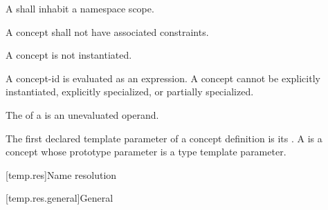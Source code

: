 \pnum
A 
shall inhabit a namespace scope.

\pnum
A concept shall not have associated constraints.

\pnum
A concept is not instantiated.
\begin{note}
A concept-id is evaluated as an expression.
A concept cannot be
explicitly instantiated,
explicitly specialized,
or partially specialized.
\end{note}

\pnum
The  of a 
is an unevaluated operand.

\pnum
The first declared template parameter of a concept definition is its
.
%
A 
is a concept whose prototype parameter
is a type template parameter.

[temp.res]{Name resolution}

[temp.res.general]{General}

